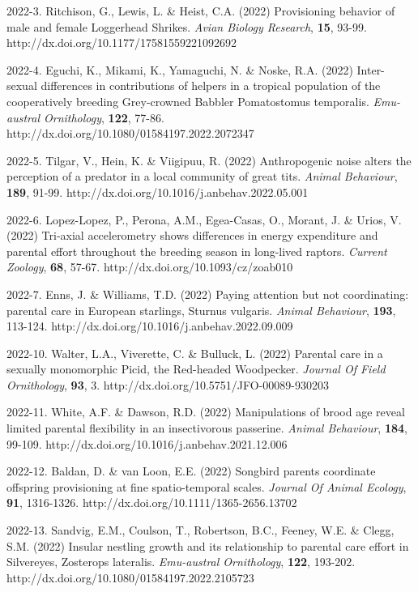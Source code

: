 2022-3. Ritchison, G., Lewis, L. \&  Heist, C.A. (2022) Provisioning behavior of male and female Loggerhead Shrikes. \textit{Avian Biology Research},  \textbf{15}, 93-99. http://dx.doi.org/10.1177/17581559221092692

2022-4. Eguchi, K., Mikami, K., Yamaguchi, N. \&  Noske, R.A. (2022) Inter-sexual differences in contributions of helpers in a tropical population of the cooperatively breeding Grey-crowned Babbler Pomatostomus temporalis. \textit{Emu-austral Ornithology},  \textbf{122}, 77-86. http://dx.doi.org/10.1080/01584197.2022.2072347

2022-5. Tilgar, V., Hein, K. \&  Viigipuu, R. (2022) Anthropogenic noise alters the perception of a predator in a local community of great tits. \textit{Animal Behaviour},  \textbf{189}, 91-99. http://dx.doi.org/10.1016/j.anbehav.2022.05.001

2022-6. Lopez-Lopez, P., Perona, A.M., Egea-Casas, O., Morant, J. \&  Urios, V. (2022) Tri-axial accelerometry shows differences in energy expenditure and parental effort throughout the breeding season in long-lived raptors. \textit{Current Zoology},  \textbf{68}, 57-67. http://dx.doi.org/10.1093/cz/zoab010

2022-7. Enns, J. \&  Williams, T.D. (2022) Paying attention but not coordinating: parental care in European starlings, Sturnus vulgaris. \textit{Animal Behaviour},  \textbf{193}, 113-124. http://dx.doi.org/10.1016/j.anbehav.2022.09.009

2022-10. Walter, L.A., Viverette, C. \&  Bulluck, L. (2022) Parental care in a sexually monomorphic Picid, the Red-headed Woodpecker. \textit{Journal Of Field Ornithology},  \textbf{93}, 3. http://dx.doi.org/10.5751/JFO-00089-930203

2022-11. White, A.F. \&  Dawson, R.D. (2022) Manipulations of brood age reveal limited parental flexibility in an insectivorous passerine. \textit{Animal Behaviour},  \textbf{184}, 99-109. http://dx.doi.org/10.1016/j.anbehav.2021.12.006

2022-12. Baldan, D. \&  van Loon, E.E. (2022) Songbird parents coordinate offspring provisioning at fine spatio-temporal scales. \textit{Journal Of Animal Ecology},  \textbf{91}, 1316-1326. http://dx.doi.org/10.1111/1365-2656.13702

2022-13. Sandvig, E.M., Coulson, T., Robertson, B.C., Feeney, W.E. \&  Clegg, S.M. (2022) Insular nestling growth and its relationship to parental care effort in Silvereyes, Zosterops lateralis. \textit{Emu-austral Ornithology},  \textbf{122}, 193-202. http://dx.doi.org/10.1080/01584197.2022.2105723

